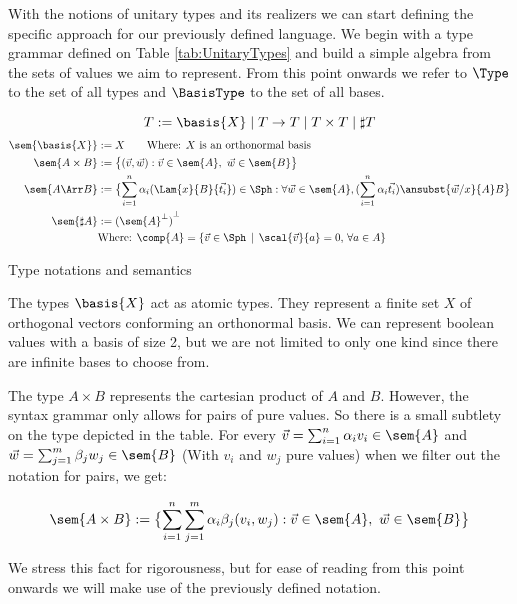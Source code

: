 With the notions of unitary types and its realizers we can start defining the specific approach for our previously defined language. We begin with a type grammar defined on Table \ref{tab:UnitaryTypes} and build a simple algebra from the sets of values we aim to represent. From this point onwards we refer to $\Type$ to the set of all types and $\BasisType$ to the set of all bases.

\begin{table*}[tb]
  \scriptsize
    \[
    T := \basis{X} \mid T\to T \mid T\times T \mid \sharp T
    \]
    \begin{align*}
    \sem{\basis{X}}&:= X\qquad\text{Where: $X$ is an orthonormal basis}\\
    \sem{A\times B}&:= \bigl\{ (\vec v, \vec w): \vec v \in{\sem{A}},~\vec w\in\sem{B}\bigr\}\\
    \sem{A\Arr B}&:=
    \bigl\{\sum_{i=1}^{n}\alpha_i(\Lam{x}{B}{\vec{t_i}})\in\Sph:\forall\vec{w}\in\sem{A}, (\sum_{i=1}^{n}\alpha_i \vec{t_i})\ansubst{\vec{w}/x}{A}\real B\bigr\}\\
    \sem{\sharp{A}}&:= {(\sem{A}^\bot)}^\bot\\
    &\text{Where: }\comp{A} = \{ \vec{v}\in \Sph \,\mid\, \scal{\vec{v}}{a} = 0,\, \forall a\in A\}
  \end{align*}
  \caption{Type notations and semantics}
  \label{tab:UnitaryTypes}
\end{table*}

The types $\basis{X}$ act as atomic types. They represent a finite set $X$ of orthogonal vectors conforming an orthonormal basis. We can represent boolean values with a basis of size 2, but we are not limited to only one kind since there are infinite bases to choose from.

The type $A\times B$ represents the cartesian product of $A$ and $B$. However, the syntax grammar only allows for pairs of pure values. So there is a small subtlety on the type depicted in the table. For every $\vec{v}=\sum_{i=1}^{n}\alpha_i v_i\in\sem{A}$ and $\vec{w}=\sum_{j=1}^{m}\beta_j w_j\in\sem{B}$ (With $v_i$ and $w_j$ pure values) when we filter out the notation for pairs, we get:

\[
  \sem{A\times B}:= \bigl\{ \sum_{i=1}^{n}\sum_{j=1}^{m}\alpha_i\beta_j(v_i, w_j): \vec v \in{\sem{A}},~\vec w\in\sem{B}\bigr\}
\]

We stress this fact for rigorousness, but for ease of reading from this point onwards we will make use of the previously defined notation.

